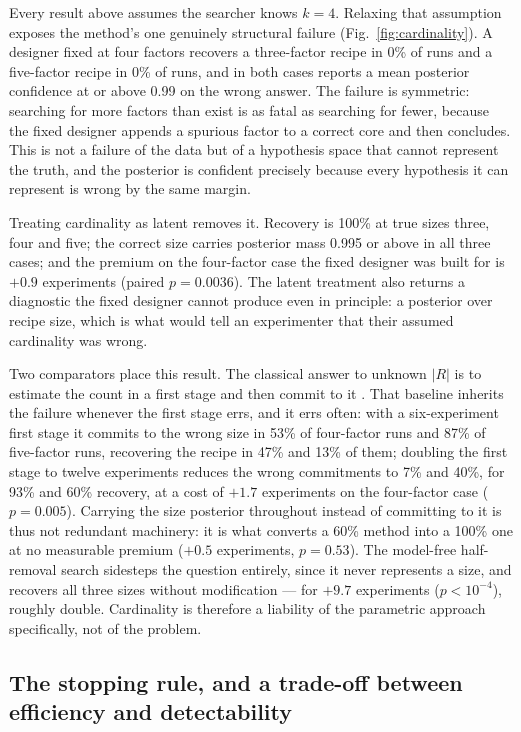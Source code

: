\documentclass[11pt]{article}
\begin{document}
Every result above assumes the searcher knows $k = 4$. Relaxing that assumption
exposes the method's one genuinely structural failure
(Fig.~\ref{fig:cardinality}). A designer fixed at four factors recovers a
three-factor recipe in 0\% of runs and a five-factor recipe in 0\% of runs, and
in both cases reports a mean posterior confidence at or above 0.99 on the wrong
answer. The failure is symmetric: searching for more factors than exist is as
fatal as searching for fewer, because the fixed designer appends a spurious
factor to a correct core and then concludes. This is not a failure of the data
but of a hypothesis space that cannot represent the truth, and the posterior is
confident precisely because every hypothesis it can represent is wrong by the
same margin.

Treating cardinality as latent removes it. Recovery is 100\% at true sizes
three, four and five; the correct size carries posterior mass 0.995 or above in
all three cases; and the premium on the four-factor case the fixed designer was
built for is $+0.9$ experiments (paired $p = 0.0036$). The latent treatment also
returns a diagnostic the fixed designer cannot produce even in principle: a
posterior over recipe size, which is what would tell an experimenter that their
assumed cardinality was wrong.

Two comparators place this result. The classical answer to unknown $|R|$ is to
estimate the count in a first stage and then commit to it \citep{bshouty2018}.
That baseline inherits the failure whenever the first stage errs, and it errs
often: with a six-experiment first stage it commits to the wrong size in 53\% of
four-factor runs and 87\% of five-factor runs, recovering the recipe in 47\% and
13\% of them; doubling the first stage to twelve experiments reduces the wrong
commitments to 7\% and 40\%, for 93\% and 60\% recovery, at a cost of
$+1.7$ experiments on the four-factor case ($p = 0.005$). Carrying the size
posterior throughout instead of committing to it is thus not redundant
machinery: it is what converts a 60\% method into a 100\% one at no measurable
premium ($+0.5$ experiments, $p = 0.53$). The model-free half-removal search
sidesteps the question entirely, since it never represents a size, and recovers
all three sizes without modification --- for $+9.7$ experiments
($p < 10^{-4}$), roughly double. Cardinality is therefore a liability of the
parametric approach specifically, not of the problem.

\subsection{The stopping rule, and a trade-off between efficiency and
detectability}
\label{sec:stopping}
\end{document}
